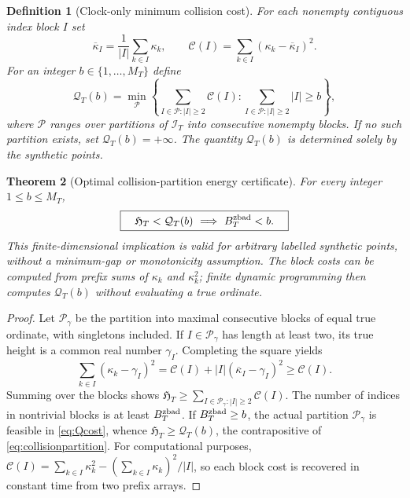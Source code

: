 \documentclass[11pt,reqno]{amsart}
\numberwithin{equation}{section}
\newtheorem{theorem}{Theorem}[section]
\newtheorem{definition}[theorem]{Definition}
\begin{document}
\begin{definition}[Clock-only minimum collision cost]
\label{def:collisioncost}
For each nonempty contiguous index block $I$ set
\begin{equation}\label{eq:collisioncost}
\overline\kappa_I=\frac1{|I|}\sum_{k\in I}\kappa_k,
\qquad
\mathcal C(I)=\sum_{k\in I}(\kappa_k-\overline\kappa_I)^2.
\end{equation}
For an integer $b\in\{1,\dots,M_T\}$ define
\begin{equation}\label{eq:Qcost}
 \mathcal Q_T(b)=\min_{\mathcal P}
 \left\{\sum_{I\in\mathcal P:|I|\ge2}\mathcal C(I):
 \sum_{I\in\mathcal P:|I|\ge2}|I|\ge b\right\},
\end{equation}
where $\mathcal P$ ranges over partitions of $\mathcal I_T$
into consecutive nonempty blocks.  If no such partition exists,
set $\mathcal Q_T(b)=+\infty$.  The quantity $\mathcal Q_T(b)$ is
determined solely by the synthetic points.
\end{definition}

\begin{theorem}[Optimal collision-partition energy certificate]
\label{thm:collisionpartition}
For every integer $1\le b\le M_T$,
\begin{equation}\label{eq:collisionpartition}
 \boxed{\quad \mathfrak H_T<\mathcal Q_T(b)
 \ \Longrightarrow\ B_T^{\rm zbad}<b.\quad}
\end{equation}
This finite-dimensional implication is valid for arbitrary labelled
synthetic points, without a minimum-gap or monotonicity assumption.
The block costs can be computed from prefix sums of $\kappa_k$ and
$\kappa_k^2$; finite dynamic programming then computes
$\mathcal Q_T(b)$ without evaluating a true ordinate.
\end{theorem}
\begin{proof}
Let $\mathcal P_\gamma$ be the partition into maximal consecutive
blocks of equal true ordinate, with singletons included.  If
$I\in\mathcal P_\gamma$ has length at least two, its true height
is a common real number $\gamma_I$. Completing the square yields
\[
 \sum_{k\in I}(\kappa_k-\gamma_I)^2
 =\mathcal C(I)+|I|(\overline\kappa_I-\gamma_I)^2
 \ge\mathcal C(I).
\]
Summing over the blocks shows
$\mathfrak H_T\ge\sum_{I\in\mathcal P_\gamma:|I|\ge2}\mathcal C(I)$.
The number of indices in nontrivial blocks is at least $B_T^{\rm zbad}$.
If $B_T^{\rm zbad}\ge b$, the actual partition $\mathcal P_\gamma$
is feasible in \eqref{eq:Qcost}, whence
$\mathfrak H_T\ge\mathcal Q_T(b)$, the contrapositive of
\eqref{eq:collisionpartition}.  For computational purposes,
\(\mathcal C(I)=\sum_{k\in I}\kappa_k^2-
 (\sum_{k\in I}\kappa_k)^2/|I|\),
so each block cost is recovered in constant time from two prefix arrays.
\end{proof}
\end{document}
